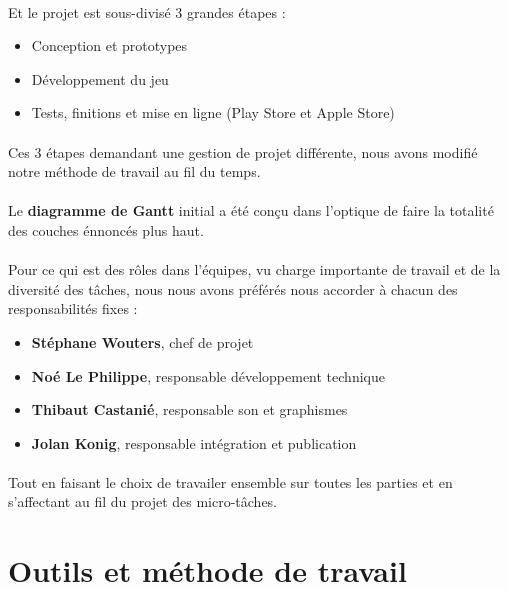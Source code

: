 \paragraph{}
Et le projet est sous-divisé 3 grandes étapes :
\begin{itemize}
\item Conception et prototypes
\item Développement du jeu
\item Tests, finitions et mise en ligne (Play Store et Apple Store)
\end{itemize}

\paragraph{}
Ces 3 étapes demandant une gestion de projet différente, nous avons modifié notre méthode de travail au fil du temps.

\paragraph{}
Le \textbf{diagramme de Gantt} initial a été conçu dans l’optique de faire la totalité des couches énnoncés plus haut.

\paragraph{}
Pour ce qui est des rôles dans l’équipes, vu charge importante de travail et de la diversité des tâches, nous nous avons préférés nous accorder à chacun des responsabilités fixes :

\begin{itemize}
\item \textbf{Stéphane Wouters}, chef de projet
\item \textbf{Noé Le Philippe}, responsable développement technique
\item \textbf{Thibaut Castanié}, responsable son et graphismes
\item \textbf{Jolan Konig}, responsable intégration et publication
\end{itemize}

\paragraph{}
Tout en faisant le choix de travailer ensemble sur toutes les parties et en s’affectant au fil du projet des micro-tâches.

\section{Outils et méthode de travail}

